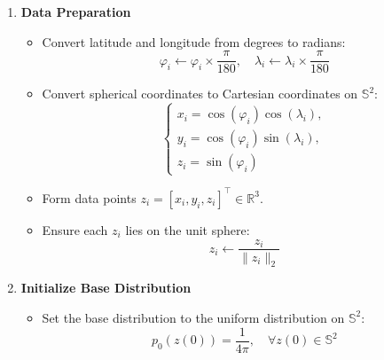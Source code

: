\documentclass[a4paper,14pt]{article}
\renewcommand{\phi}{\ensuremath{\varphi}}
\theoremstyle{plain} %
\theoremstyle{definition} %
\theoremstyle{remark} %
\begin{document}
	\begin{enumerate}
		\item \textbf{Data Preparation}
		\begin{itemize}
			\item Convert latitude and longitude from degrees to radians:
			\[
			\phi_i \leftarrow \phi_i \times \frac{\pi}{180}, \quad \lambda_i \leftarrow \lambda_i \times \frac{\pi}{180}
			\]
			\item Convert spherical coordinates to Cartesian coordinates on \(\mathbb{S}^2\):
			\[
			\begin{cases}
				x_i = \cos(\phi_i) \cos(\lambda_i), \\
				y_i = \cos(\phi_i) \sin(\lambda_i), \\
				z_i = \sin(\phi_i)
			\end{cases}
			\]
			\item Form data points \( z_i = [x_i, y_i, z_i]^\top \in \mathbb{R}^3 \).
			\item Ensure each \( z_i \) lies on the unit sphere:
			\[
			z_i \leftarrow \frac{z_i}{\| z_i \|_2}
			\]
		\end{itemize}
		
		\item \textbf{Initialize Base Distribution}
		\begin{itemize}
			\item Set the base distribution to the uniform distribution on \(\mathbb{S}^2\):
			\[
			p_0(z(0)) = \frac{1}{4\pi}, \quad \forall z(0) \in \mathbb{S}^2
			\]
		\end{itemize}
		

\end{enumerate}
\end{document}
